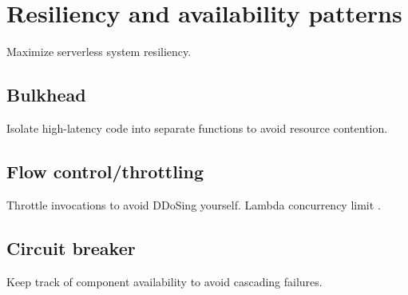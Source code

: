 \section{Resiliency and availability patterns} \label{sec:resiliencyPatterns}

Maximize serverless system resiliency.

\subsection{Bulkhead} \label{subsec:Bulkhead}

Isolate high-latency code into separate functions to avoid resource contention.

\subsection{Flow control/throttling} \label{subsec:Flow control/throttling}

Throttle invocations to avoid DDoSing yourself. Lambda concurrency limit \textcite{aws18serverlessLens}.

\subsection{Circuit breaker} \label{subsec:Circuit breaker}

Keep track of component availability to avoid cascading failures.

